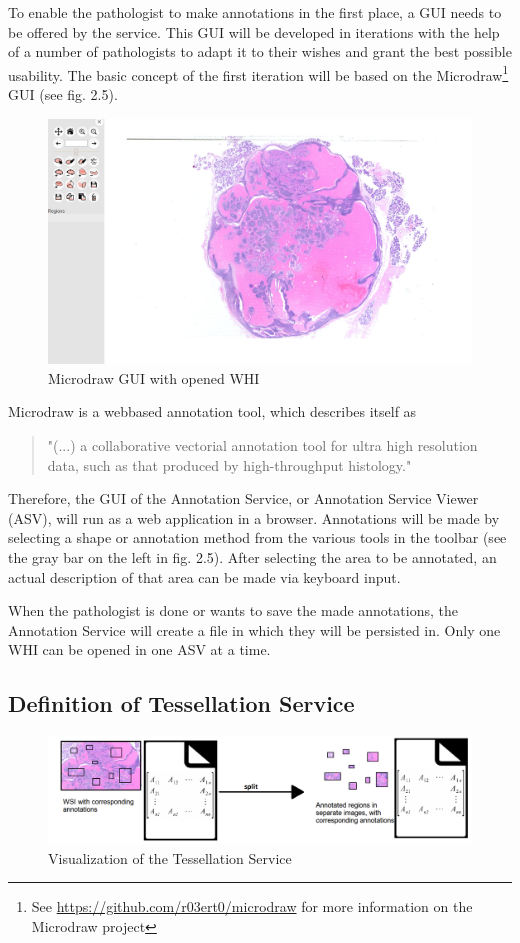 To enable the pathologist to make annotations in the first place, a GUI needs to be offered by the service. This GUI will be developed in iterations with the help of a number of pathologists to adapt it to their wishes and grant the best possible usability. The basic concept of the first iteration will be based on the Microdraw\footnote{See \url{https://github.com/r03ert0/microdraw} for more information on the Microdraw project} GUI (see fig. 2.5).

\begin{figure}[H]
	\begin{center}
		\includegraphics[scale=0.2]{img/microdrawUI.png}
		\caption{Microdraw GUI with opened WHI}
		\label{fig:fig2.5}
	\end{center}
\end{figure}

Microdraw is a webbased annotation tool, which describes itself as

\begin{quotation}
"(...) a collaborative vectorial annotation tool for ultra high resolution data, such as that produced by high-throughput histology." \cite{web:microdraw}
\end{quotation}

Therefore, the GUI of the Annotation Service, or Annotation Service Viewer (ASV), will run as a web application in a browser. Annotations will be made by selecting a shape or annotation method from the various tools in the toolbar (see the gray bar on the left in fig. 2.5). After selecting the area to be annotated, an actual description of that area can be made via keyboard input.

When the pathologist is done or wants to save the made annotations, the Annotation Service will create a file in which they will be persisted in. Only one WHI can be opened in one ASV at a time.


\subsection{Definition of Tessellation Service}
\begin{figure}[H]
	\begin{center}
		\includegraphics[scale=0.3]{img/processChainC.png}
		\caption{Visualization of the Tessellation Service}
		\label{fig:fig2.6}
	\end{center}
\end{figure}